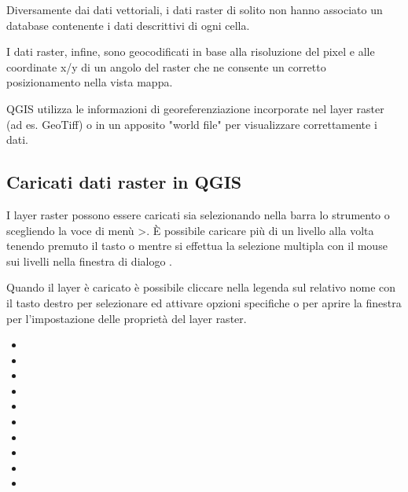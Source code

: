 Diversamente dai dati vettoriali, i dati raster di solito non hanno associato
un database contenente i dati descrittivi di ogni cella.

I dati raster, infine, sono geocodificati in base alla risoluzione del pixel e
alle coordinate x/y di un angolo del raster che ne consente un corretto
posizionamento nella vista mappa. 

QGIS utilizza le informazioni di georeferenziazione incorporate nel layer
raster (ad es. GeoTiff) o in un apposito "world file" per visualizzare
correttamente i dati.
	
\subsection{Caricati dati raster in QGIS}\label{label_loadraster}

I layer raster possono essere caricati sia selezionando nella barra lo
strumento  o
scegliendo la voce di menù
>. È possibile caricare più di un livello alla volta tenendo premuto il
tasto  o  mentre si effettua la selezione
multipla con il mouse sui livelli nella finestra di dialogo .

Quando il layer è caricato è possibile cliccare nella legenda sul relativo
nome con il tasto destro per selezionare ed attivare opzioni specifiche o per
aprire la finestra per l'impostazione delle proprietà del layer raster.


\begin{itemize}
\item {}
\item {}
\item {}
\item {}
\item {}
\item {}
\item {}
\item {}
\item {}
\item {}
\end{itemize}
	
